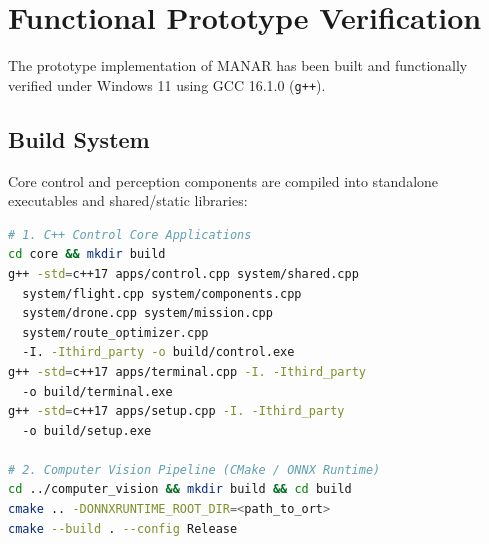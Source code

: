 \section{Functional Prototype Verification}

The prototype implementation of MANAR has been built and functionally verified under Windows 11 using GCC 16.1.0 (\texttt{g++}).

\subsection{Build System}
Core control and perception components are compiled into standalone executables and shared/static libraries:
\begin{lstlisting}[language=bash, caption={MANAR C++ core and computer vision compilation commands.}]
# 1. C++ Control Core Applications
cd core && mkdir build
g++ -std=c++17 apps/control.cpp system/shared.cpp
  system/flight.cpp system/components.cpp
  system/drone.cpp system/mission.cpp
  system/route_optimizer.cpp
  -I. -Ithird_party -o build/control.exe
g++ -std=c++17 apps/terminal.cpp -I. -Ithird_party
  -o build/terminal.exe
g++ -std=c++17 apps/setup.cpp -I. -Ithird_party
  -o build/setup.exe

# 2. Computer Vision Pipeline (CMake / ONNX Runtime)
cd ../computer_vision && mkdir build && cd build
cmake .. -DONNXRUNTIME_ROOT_DIR=<path_to_ort>
cmake --build . --config Release
\end{lstlisting}

